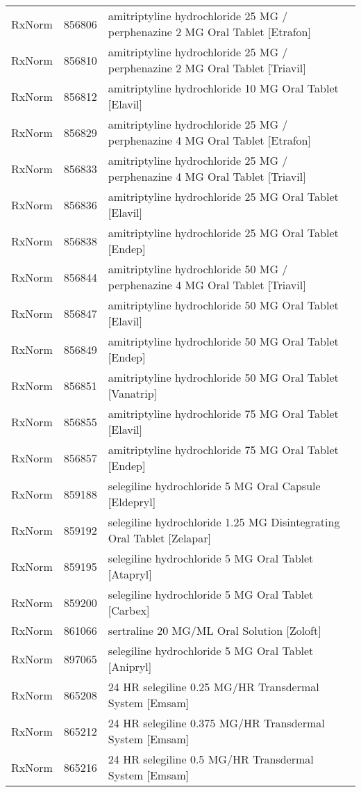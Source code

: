 \begin{longtable}{p{}p{}p{}}
  RxNorm & 856806 & amitriptyline hydrochloride 25 MG / perphenazine 2 MG Oral Tablet [Etrafon] \\ 
  RxNorm & 856810 & amitriptyline hydrochloride 25 MG / perphenazine 2 MG Oral Tablet [Triavil] \\ 
  RxNorm & 856812 & amitriptyline hydrochloride 10 MG Oral Tablet [Elavil] \\ 
  RxNorm & 856829 & amitriptyline hydrochloride 25 MG / perphenazine 4 MG Oral Tablet [Etrafon] \\ 
  RxNorm & 856833 & amitriptyline hydrochloride 25 MG / perphenazine 4 MG Oral Tablet [Triavil] \\ 
  RxNorm & 856836 & amitriptyline hydrochloride 25 MG Oral Tablet [Elavil] \\ 
  RxNorm & 856838 & amitriptyline hydrochloride 25 MG Oral Tablet [Endep] \\ 
  RxNorm & 856844 & amitriptyline hydrochloride 50 MG / perphenazine 4 MG Oral Tablet [Triavil] \\ 
  RxNorm & 856847 & amitriptyline hydrochloride 50 MG Oral Tablet [Elavil] \\ 
  RxNorm & 856849 & amitriptyline hydrochloride 50 MG Oral Tablet [Endep] \\ 
  RxNorm & 856851 & amitriptyline hydrochloride 50 MG Oral Tablet [Vanatrip] \\ 
  RxNorm & 856855 & amitriptyline hydrochloride 75 MG Oral Tablet [Elavil] \\ 
  RxNorm & 856857 & amitriptyline hydrochloride 75 MG Oral Tablet [Endep] \\ 
  RxNorm & 859188 & selegiline hydrochloride 5 MG Oral Capsule [Eldepryl] \\ 
  RxNorm & 859192 & selegiline hydrochloride 1.25 MG Disintegrating Oral Tablet [Zelapar] \\ 
  RxNorm & 859195 & selegiline hydrochloride 5 MG Oral Tablet [Atapryl] \\ 
  RxNorm & 859200 & selegiline hydrochloride 5 MG Oral Tablet [Carbex] \\ 
  RxNorm & 861066 & sertraline 20 MG/ML Oral Solution [Zoloft] \\ 
  RxNorm & 897065 & selegiline hydrochloride 5 MG Oral Tablet [Anipryl] \\ 
  RxNorm & 865208 & 24 HR selegiline 0.25 MG/HR Transdermal System [Emsam] \\ 
  RxNorm & 865212 & 24 HR selegiline 0.375 MG/HR Transdermal System [Emsam] \\ 
  RxNorm & 865216 & 24 HR selegiline 0.5 MG/HR Transdermal System [Emsam] \\ 

\end{longtable}
